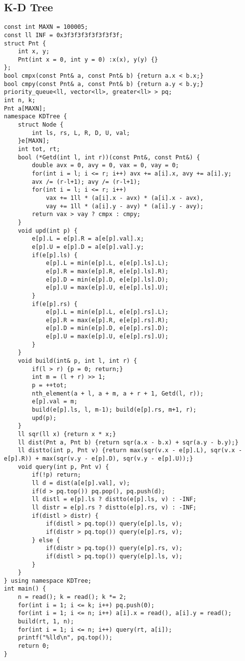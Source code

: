 \documentclass{article}
\begin{document}
\subsection{K-D Tree}
\begin{lstlisting}
const int MAXN = 100005;
const ll INF = 0x3f3f3f3f3f3f3f3f;
struct Pnt {
	int x, y;
	Pnt(int x = 0, int y = 0) :x(x), y(y) {}
};
bool cmpx(const Pnt& a, const Pnt& b) {return a.x < b.x;}
bool cmpy(const Pnt& a, const Pnt& b) {return a.y < b.y;}
priority_queue<ll, vector<ll>, greater<ll> > pq;
int n, k;
Pnt a[MAXN];
namespace KDTree {
	struct Node {
		int ls, rs, L, R, D, U, val;
	}e[MAXN];
	int tot, rt;
	bool (*Getd(int l, int r))(const Pnt&, const Pnt&) {
		double avx = 0, avy = 0, vax = 0, vay = 0;
		for(int i = l; i <= r; i++) avx += a[i].x, avy += a[i].y;
		avx /= (r-l+1); avy /= (r-l+1);
		for(int i = l; i <= r; i++)
			vax += 1ll * (a[i].x - avx) * (a[i].x - avx),
			vay += 1ll * (a[i].y - avy) * (a[i].y - avy);
		return vax > vay ? cmpx : cmpy;
	}
	void upd(int p) {
		e[p].L = e[p].R = a[e[p].val].x;
		e[p].U = e[p].D = a[e[p].val].y;
		if(e[p].ls) {
			e[p].L = min(e[p].L, e[e[p].ls].L);
			e[p].R = max(e[p].R, e[e[p].ls].R);
			e[p].D = min(e[p].D, e[e[p].ls].D);
			e[p].U = max(e[p].U, e[e[p].ls].U);
		} 
		if(e[p].rs) {
			e[p].L = min(e[p].L, e[e[p].rs].L);
			e[p].R = max(e[p].R, e[e[p].rs].R);
			e[p].D = min(e[p].D, e[e[p].rs].D);
			e[p].U = max(e[p].U, e[e[p].rs].U);
		} 
	}
	void build(int& p, int l, int r) {
		if(l > r) {p = 0; return;}
		int m = (l + r) >> 1;
		p = ++tot;
		nth_element(a + l, a + m, a + r + 1, Getd(l, r));
		e[p].val = m;
		build(e[p].ls, l, m-1); build(e[p].rs, m+1, r);
		upd(p);
	}
	ll sqr(ll x) {return x * x;}
	ll dist(Pnt a, Pnt b) {return sqr(a.x - b.x) + sqr(a.y - b.y);}
	ll distto(int p, Pnt v) {return max(sqr(v.x - e[p].L), sqr(v.x - e[p].R)) + max(sqr(v.y - e[p].D), sqr(v.y - e[p].U));}
	void query(int p, Pnt v) {
		if(!p) return;
		ll d = dist(a[e[p].val], v);
		if(d > pq.top()) pq.pop(), pq.push(d);
		ll distl = e[p].ls ? distto(e[p].ls, v) : -INF;
		ll distr = e[p].rs ? distto(e[p].rs, v) : -INF;
		if(distl > distr) {
			if(distl > pq.top()) query(e[p].ls, v);
			if(distr > pq.top()) query(e[p].rs, v);
		} else {
			if(distr > pq.top()) query(e[p].rs, v);
			if(distl > pq.top()) query(e[p].ls, v);
		}
	}
} using namespace KDTree;
int main() {
	n = read(); k = read(); k *= 2;
	for(int i = 1; i <= k; i++) pq.push(0);
	for(int i = 1; i <= n; i++) a[i].x = read(), a[i].y = read();
	build(rt, 1, n);
	for(int i = 1; i <= n; i++) query(rt, a[i]);
	printf("%lld\n", pq.top());
	return 0;
}

\end{lstlisting}
\end{document}
